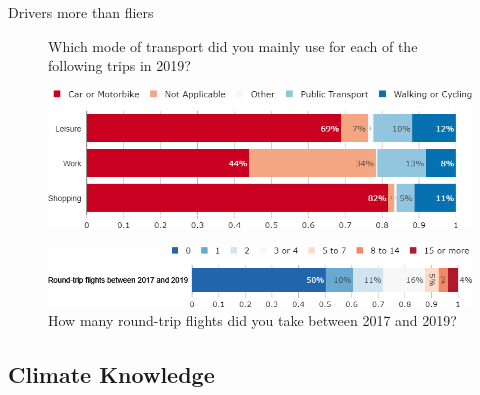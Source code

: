\begin{framefont}{\small}
\begin{frame}{Drivers more than fliers}%
\begin{figure}[h!]
\centering
\caption{Which mode of transport did you mainly use for each of the following trips in 2019?}
\includegraphics[width=.61\paperwidth]{../figures/FR/transport_FR.png} \\
\vspace{.5cm}
\caption{How many round-trip flights did you take between 2017 and 2019?}
\includegraphics[width=.61\paperwidth]{../figures/FR/flights_3y_FR.png}
\end{figure}
\end{frame}



\subsection{Climate Knowledge}



\end{framefont}
